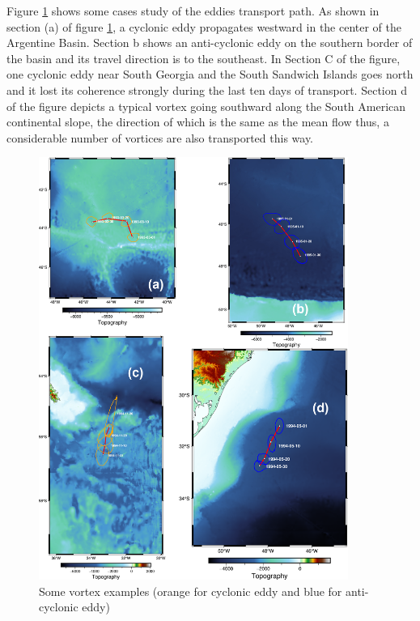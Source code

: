 Figure \ref{some vortex examples} shows some cases study of the  eddies transport path. As shown in section (a) of figure \ref{some vortex examples}, a cyclonic eddy propagates westward in the center of the Argentine Basin. Section b shows an anti-cyclonic eddy on the southern border of the basin and its travel direction is to the southeast. In Section C of the figure, one cyclonic eddy near South Georgia and the South Sandwich Islands goes north and it lost its coherence strongly during the last ten days of transport. Section d of the figure depicts a typical vortex going southward along the South American continental slope, the direction of which is the same as the mean flow thus, a considerable number of vortices are also transported this way.


\begin{figure}
    \centering
    \includegraphics[width = 0.9\textwidth]{chapter/figure/eddy map.png}
    \caption{Some vortex examples (orange for cyclonic eddy and blue for anti-cyclonic eddy)}
    \label{some vortex examples}
\end{figure}

